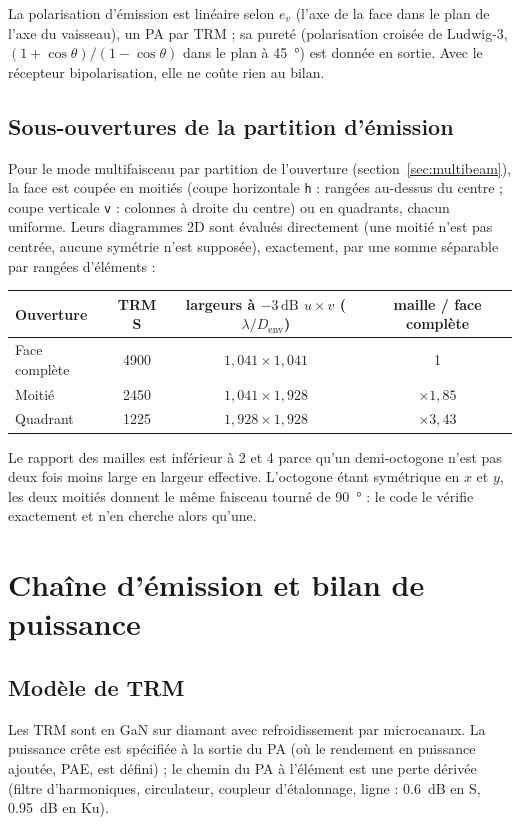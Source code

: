 \documentclass[11pt,a4paper]{article}
\newcommand{\code}[1]{\texttt{\small #1}}
\newcommand{\dB}{\,\mathrm{dB}}
\newcommand{\Denv}{D_{\mathrm{env}}}
\begin{document}
La polarisation d'émission est linéaire selon $e_v$ (l'axe de la face dans le plan de l'axe du vaisseau), un PA par
TRM ; sa pureté (polarisation croisée de Ludwig-3, $(1+\cos\theta)/(1-\cos\theta)$ dans le plan à \SI{45}{\degree}) est
donnée en sortie. Avec le récepteur bipolarisation, elle ne coûte rien au bilan.

\subsection{Sous-ouvertures de la partition d'émission}\label{sec:subap}
Pour le mode multifaisceau par partition de l'ouverture (section~\ref{sec:multibeam}), la face est coupée en moitiés
(coupe horizontale \code{h} : rangées au-dessus du centre ; coupe verticale \code{v} : colonnes à droite du centre) ou
en quadrants, chacun uniforme. Leurs diagrammes 2D sont évalués directement (une moitié n'est pas centrée, aucune
symétrie n'est supposée), exactement, par une somme séparable par rangées d'éléments :
\begin{center}
\begin{tabular}{@{}lccc@{}}
\toprule
Ouverture & TRM S & largeurs à $-3\dB$ $u\times v$ ($\lambda/\Denv$) & maille / face complète\\
\midrule
Face complète & \num{4900} & $1,041\times1,041$ & 1\\
Moitié & \num{2450} & $1,041\times1,928$ & $\times1,85$\\
Quadrant & \num{1225} & $1,928\times1,928$ & $\times3,43$\\
\bottomrule
\end{tabular}
\end{center}
Le rapport des mailles est inférieur à 2 et 4 parce qu'un demi-octogone n'est pas deux fois moins large en largeur
effective. L'octogone étant symétrique en $x$ et $y$, les deux moitiés donnent le même faisceau tourné de
\SI{90}{\degree} : le code le vérifie exactement et n'en cherche alors qu'une.

\section{Chaîne d'émission et bilan de puissance}

\subsection{Modèle de TRM}
Les TRM sont en GaN sur diamant avec refroidissement par microcanaux. La puissance crête est spécifiée à la sortie du
PA (où le rendement en puissance ajoutée, PAE, est défini) ; le chemin du PA à l'élément est une perte dérivée (filtre
d'harmoniques, circulateur, coupleur d'étalonnage, ligne : \SI{0.6}{dB} en S, \SI{0.95}{dB} en Ku).
\end{document}
